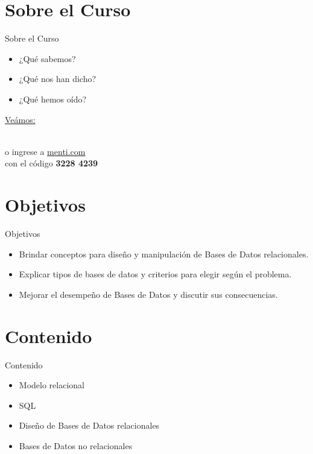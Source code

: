 \documentclass{beamer}
\begin{document}
\section{Sobre el Curso}

\begin{frame}{Sobre el Curso}
\begin{itemize}
    \item ¿Qué sabemos?
    \item ¿Qué nos han dicho?
    \item ¿Qué hemos oído?
\end{itemize}

    \centering
    \vspace{10mm}
    {\small \href{https://www.mentimeter.com/app/presentation/alwg84st66fh5c49yxg9r7k3i5jqhuwn/edit?question=uah1wimn5n7w}{Veámos:}}\\
    \vspace{2mm}
  
    \\
    \vspace{2mm}
    \footnotesize  o ingrese a \href{https://www.menti.com/}{menti.com}\\ con el código \textbf{3228 4239}
\end{frame}

\section{Objetivos}

\begin{frame}{Objetivos}
\begin{itemize}
    \item Brindar conceptos para diseño y manipulación de Bases de Datos relacionales.
    \item Explicar tipos de bases de datos y criterios para elegir según el problema.
    \item Mejorar el desempeño de Bases de Datos y discutir sus consecuencias.
\end{itemize}
\end{frame}

\section{Contenido}

\begin{frame}{Contenido}
\begin{itemize}
    \item Modelo relacional
    \item SQL
    \item Diseño de Bases de Datos relacionales
    \item Bases de Datos no relacionales
\end{itemize}
\end{frame}
\end{document}

